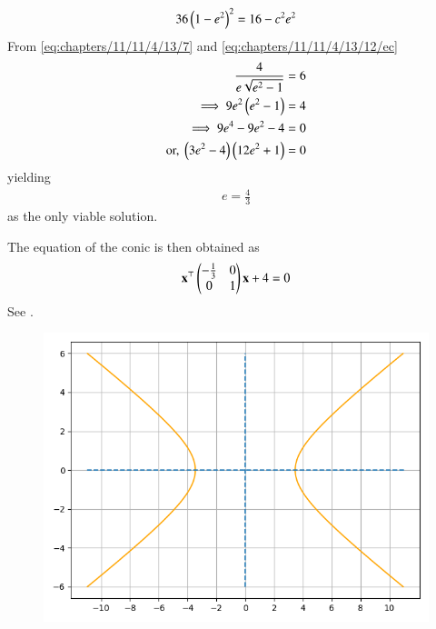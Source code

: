 \begin{enumerate}
		\begin{align}
	36\left(1-e^2\right)^2 = 16-c^2e^2
\label{eq:chapters/11/11/4/13/12/ec}
\end{align}
From
	\eqref{eq:chapters/11/11/4/13/7}
	and
\eqref{eq:chapters/11/11/4/13/12/ec}
\begin{align}
\frac{4}{e\sqrt{e^2-1}} &= 6
\\
\implies 9e^2\left(e^2-1\right) &= 4\\
\implies 9e^4-9e^2-4 &= 0
\\
	\text{or, }\left(3e^2-4\right)
	\left(12e^2+1\right) &=0
\label{eq:chapters/11/11/4/13/14}
\end{align}
yielding
\begin{align}
e = \frac{4}{3}
\end{align}
as the only viable solution.
\end{enumerate}
The equation of the conic is then obtained as
\begin{align}
\mathbf{x}^\top\begin{pmatrix}-\frac{1}{3}&0\\0&1\end{pmatrix}\mathbf{x} +4 = 0
\end{align}
See .
\begin{figure}[ht]
\centering
\includegraphics[width = \columnwidth]{chapters/11/11/4/13/figs/fig1.png}
\caption{}
\label{fig:chapters/11/11/4/13/1}
\end{figure}
\begin{table}[h]
\centering

\caption{}
\label{tab:chapters/11/11/4/13/1}
\end{table}
